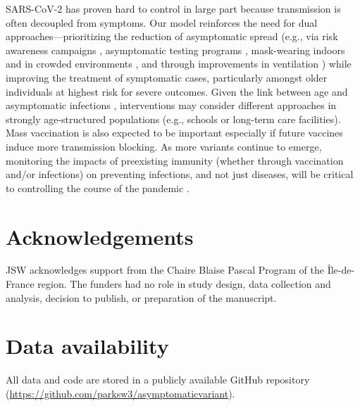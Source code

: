 \documentclass[12pt]{article}
\begin{document}
SARS-CoV-2 has proven hard to control in large part because transmission is often decoupled from symptoms. 
Our model reinforces the need for dual approaches---prioritizing the reduction of asymptomatic spread (e.g., via risk awareness campaigns \citep{chande2020real,sinclair2021pairing}, asymptomatic testing programs \citep{mina2021covid,gibson2022surv}, mask-wearing indoors and in crowded environments \citep{jones2020two,prather2020reducing,howard2021ev}, and through improvements in ventilation \citep{allen2021indoor,wang2021airborne}) while improving the treatment of symptomatic cases, particularly amongst older individuals at highest risk for severe outcomes.
Given the link between age and asymptomatic infections \citep{davies2020}, interventions may consider different approaches in strongly age-structured populations (e.g., schools or long-term care facilities).
Mass vaccination is also expected to be important especially if future vaccines induce more transmission blocking.
As more variants continue to emerge, monitoring the impacts of preexisting immunity (whether through vaccination and/or infections) on preventing infections, and not just diseases, will be critical to controlling the course of the pandemic \citep{lopman2021framework}.

\section*{Acknowledgements}

JSW acknowledges support from the Chaire Blaise Pascal Program of the Île-de-France region.
The funders had no role in study design, data collection and analysis, decision to publish, or preparation of the manuscript. 

\section*{Data availability}

All data and code are stored in a publicly available GitHub repository (\url{https://github.com/parksw3/asymptomaticvariant}).
\end{document}
